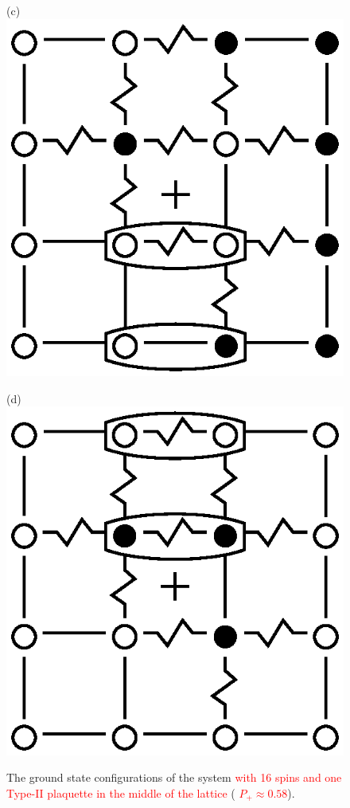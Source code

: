\documentclass[preprint,12pt]{elsarticle}
\begin{document}
\begin{figure}[H]
\begin{minipage}[h]{0.2\linewidth}
		\end{minipage}
		\hfill
		\begin{minipage}[h]{0.2\linewidth}
			\centering(c)
			\includegraphics[width=1\linewidth]{pictures/Cl1_Type2_gs3.eps}
		\end{minipage}
		\hfill
		\begin{minipage}[h]{0.2\linewidth}
			\centering(d)
			\includegraphics[width=1\linewidth]{pictures/Cl1_Type2_gs4.eps}
		\end{minipage}
		\caption{The ground state configurations of the system \textcolor{red}{with 16 spins and one Type-II plaquette in the middle of the lattice} (\textcolor{red}{  $P_+\approx0.58$}).}
		\label{fig:4x4.1}
		

\end{figure}
\end{document}

